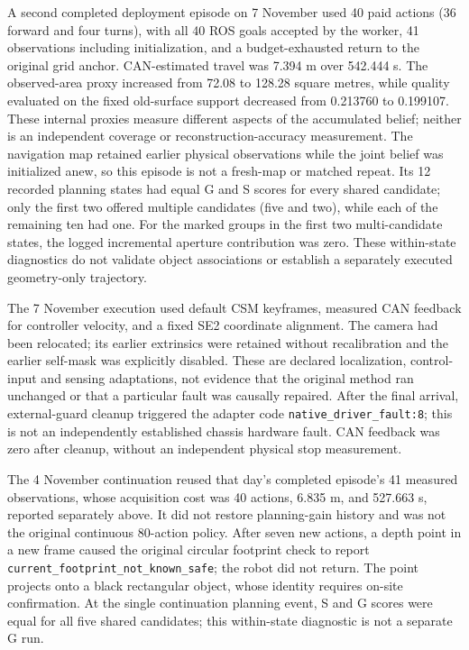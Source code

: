 \documentclass[11pt,a4paper]{article}
\begin{document}
A second completed deployment episode on 7 November used 40 paid actions (36 forward and four turns), with all 40 ROS goals accepted by the worker, 41 observations including initialization, and a budget-exhausted return to the original grid anchor. CAN-estimated travel was 7.394 m over 542.444 s. The observed-area proxy increased from 72.08 to 128.28 square metres, while quality evaluated on the fixed old-surface support decreased from 0.213760 to 0.199107. These internal proxies measure different aspects of the accumulated belief; neither is an independent coverage or reconstruction-accuracy measurement. The navigation map retained earlier physical observations while the joint belief was initialized anew, so this episode is not a fresh-map or matched repeat. Its 12 recorded planning states had equal G and S scores for every shared candidate; only the first two offered multiple candidates (five and two), while each of the remaining ten had one. For the marked groups in the first two multi-candidate states, the logged incremental aperture contribution was zero. These within-state diagnostics do not validate object associations or establish a separately executed geometry-only trajectory.

The 7 November execution used default CSM keyframes, measured CAN feedback for controller velocity, and a fixed SE2 coordinate alignment. The camera had been relocated; its earlier extrinsics were retained without recalibration and the earlier self-mask was explicitly disabled. These are declared localization, control-input and sensing adaptations, not evidence that the original method ran unchanged or that a particular fault was causally repaired. After the final arrival, external-guard cleanup triggered the adapter code \texttt{native\_driver\_fault:8}; this is not an independently established chassis hardware fault. CAN feedback was zero after cleanup, without an independent physical stop measurement.

The 4 November continuation reused that day's completed episode\textquoteright s 41 measured observations, whose acquisition cost was 40 actions, 6.835 m, and 527.663 s, reported separately above. It did not restore planning-gain history and was not the original continuous 80-action policy. After seven new actions, a depth point in a new frame caused the original circular footprint check to report \texttt{current\_footprint\_not\_known\_safe}; the robot did not return. The point projects onto a black rectangular object, whose identity requires on-site confirmation. At the single continuation planning event, S and G scores were equal for all five shared candidates; this within-state diagnostic is not a separate G run.
\end{document}
